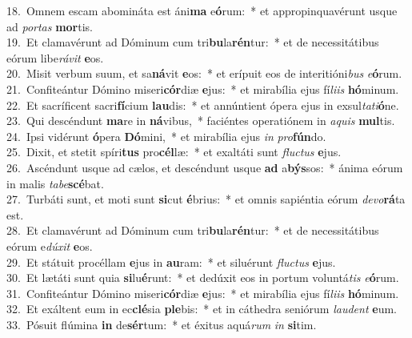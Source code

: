 {18.~}Omnem escam abomináta est áni\textbf{ma} e\textbf{ó}rum:~* et appropinquavérunt usque ad \textit{por}\textit{tas} \textbf{mor}tis.\\
{19.~}Et clamavérunt ad Dóminum cum tri\textbf{bu}la\textbf{rén}tur:~* et de necessitátibus eórum libe\textit{rá}\textit{vit} \textbf{e}os.\\
{20.~}Misit verbum suum, et sa\textbf{ná}vit \textbf{e}os:~* et erípuit eos de interitióni\textit{bus} \textit{e}\textbf{ó}rum.\\
{21.~}Confiteántur Dómino miseri\textbf{cór}diæ \textbf{e}jus:~* et mirabília ejus fí\textit{li}\textit{is} \textbf{hó}minum.\\
{22.~}Et sacríficent sacri\textbf{fí}cium \textbf{lau}dis:~* et annúntient ópera ejus in exsul\textit{ta}\textit{ti}\textbf{ó}ne.\\
{23.~}Qui descéndunt \textbf{ma}re in \textbf{ná}vibus,~* faciéntes operatiónem in \textit{a}\textit{quis} \textbf{mul}tis.\\
{24.~}Ipsi vidérunt \textbf{ó}pera \textbf{Dó}mini,~* et mirabília ejus \textit{in} \textit{pro}\textbf{fún}do.\\
{25.~}Dixit, et stetit spíri\textbf{tus} pro\textbf{cél}læ:~* et exaltáti sunt \textit{flu}\textit{ctus} \textbf{e}jus.\\
{26.~}Ascéndunt usque ad cælos, et descéndunt usque \textbf{ad} a\textbf{býs}sos:~* ánima eórum in malis \textit{ta}\textit{be}\textbf{scé}bat.\\
{27.~}Turbáti sunt, et moti sunt \textbf{si}cut \textbf{é}brius:~* et omnis sapiéntia eórum \textit{de}\textit{vo}\textbf{rá}ta est.\\
{28.~}Et clamavérunt ad Dóminum cum tri\textbf{bu}la\textbf{rén}tur:~* et de necessitátibus eórum e\textit{dú}\textit{xit} \textbf{e}os.\\
{29.~}Et státuit procéllam \textbf{e}jus in \textbf{au}ram:~* et siluérunt \textit{flu}\textit{ctus} \textbf{e}jus.\\
{30.~}Et lætáti sunt quia \textbf{si}lu\textbf{é}runt:~* et dedúxit eos in portum voluntá\textit{tis} \textit{e}\textbf{ó}rum.\\
{31.~}Confiteántur Dómino miseri\textbf{cór}diæ \textbf{e}jus:~* et mirabília ejus fí\textit{li}\textit{is} \textbf{hó}minum.\\
{32.~}Et exáltent eum in ec\textbf{clé}sia \textbf{ple}bis:~* et in cáthedra seniórum \textit{lau}\textit{dent} \textbf{e}um.\\
{33.~}Pósuit flúmina \textbf{in} de\textbf{sér}tum:~* et éxitus aquá\textit{rum} \textit{in} \textbf{si}tim.\\
